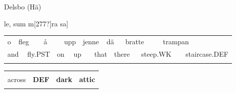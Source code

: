 \begin{listWWNumileveli}
\item 

\begin{styleExample}
Delsbo (Hä)

\end{styleExample}

\end{listWWNumileveli}

\begin{styleExText}
[Marget o j$\Theta $ j[277?]le, sum m[277?]ra sa]

\end{styleExText}

\begin{tabular}{llllllllllllllll}
\lsptoprule
o & \multicolumn{2}{l}{fleg

} & \multicolumn{2}{l}{å

} & \multicolumn{2}{l}{upp

} & \multicolumn{2}{l}{jenne

} & \multicolumn{2}{l}{dä

} & \multicolumn{2}{l}{bratte

} & \multicolumn{2}{l}{trampan

} & \\
\multicolumn{2}{l}{and

} & \multicolumn{2}{l}{fly.PST

} & \multicolumn{2}{l}{on

} & \multicolumn{2}{l}{up

} & \multicolumn{2}{l}{that

} & \multicolumn{2}{l}{there

} & \multicolumn{2}{l}{steep.WK

} & \multicolumn{2}{l}{staircase.DEF

}\\
\lspbottomrule
\end{tabular}

\begin{tabular}{llll}
\lsptoprule
\multicolumn{4}{l}{evver

}\\
across & {\bfseries DEF} & {\bfseries dark} & {\bfseries attic}\\
\lspbottomrule
\end{tabular}

